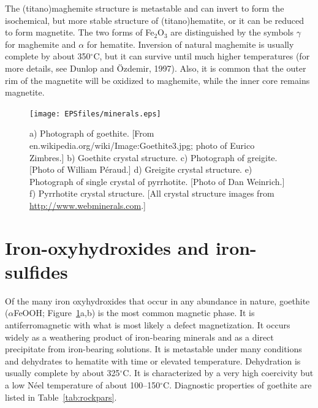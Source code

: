  


 The (titano)maghemite  structure is metastable and can invert to form the isochemical, but more stable structure of (titano)hematite, or it can be reduced to form magnetite.    The two forms of Fe$_2$O$_3$ are distinguished by the symbols $\gamma$ for maghemite and $\alpha$ for hematite.    Inversion of natural maghemite is usually complete by about 350$^{\circ}$C,
but it can survive until much higher temperatures (for more details, see
\nocite{dunlop97}
 Dunlop and \"Ozdemir, 1997).     Also, it is common that the outer rim of the magnetite will be oxidized to maghemite, while the inner core remains magnetite.    


 
\begin{figure}[htb]
\centering  \texttt{[image: EPSfiles/minerals.eps]}
\caption{  a) Photograph of goethite. [From  en.wikipedia.org/wiki/Image:Goethite3.jpg; photo of  Eurico Zimbres.]   b) Goethite crystal structure. 
c) Photograph of greigite.  [Photo of William P\'eraud.]   d) Greigite crystal structure. 
e) Photograph of single crystal of pyrrhotite. [Photo of Dan Weinrich.]  f) Pyrrhotite crystal structure.  [All crystal structure images from \url{http://www.webminerals.com}.]}
\label{fig:minerals}
\end{figure}


\section {Iron-oxyhydroxides and iron-sulfides}
\label{sect:pyrrho}

%
Of the many  iron oxyhydroxides that occur in any abundance
in nature, 
%
goethite ($\alpha$FeOOH; Figure~\ref{fig:minerals}a,b) is the most common magnetic phase. It is
%
%
antiferromagnetic with what is 
most likely a defect magnetization.  It occurs
widely as a weathering product of iron-bearing minerals and as a direct
precipitate from iron-bearing solutions.  It is metastable  under
many conditions and dehydrates to
hematite with time or elevated temperature.  Dehydration is usually complete by
about 325$^{\circ}$C.  It is characterized by a very high coercivity but a low 
N\'eel
temperature of about 100--150$^{\circ}$C.
 Diagnostic properties of goethite are listed in Table~\ref{tab:rockpars}.
 


